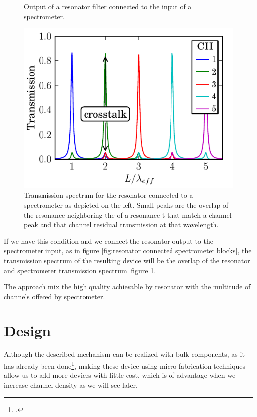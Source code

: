 \documentclass[12pt,twoside,english]{book}
\renewcommand{\~}{\perispomeni}%
\numberwithin{equation}{section}
\numberwithin{figure}{section}
\begin{document}
\begin{figure}[h]
	\begin{minipage}[t]{0.49\columnwidth}%
	
	\caption{Output of a resonator filter connected to the input of a spectrometer.}
	\label{fig:resonator connected spectrometer blocks}
	\end{minipage}\hfill
	\begin{minipage}[t]{0.49\columnwidth}%
	\includegraphics{ring-enhaced-tog}
	\caption{Transmission spectrum for the resonator connected to a spectrometer as depicted on the left. Small peaks are the overlap of the resonance neighboring the of a resonance t that match a channel peak and that channel residual transmission at that wavelength.}
	\label{fig:spectrum resonator connected spectrometer}
	\end{minipage}
\end{figure}
If we have this condition and we connect the resonator output to the spectrometer input, as in figure \ref{fig:resonator connected spectrometer blocks}, the transmission spectrum of the resulting device will be the overlap of the resonator and spectrometer transmission spectrum, figure \ref{fig:spectrum resonator connected spectrometer}.

The approach mix the high quality achievable by resonator with the multitude of channels offered by spectrometer.

\section{Design}
Although the described mechanism can be realized with bulk components, as it has already been done\footcite{bajraszewski:2008p1743}, making these device using micro-fabrication techniques allow us to add more devices with little cost, which is of advantage when we increase channel density as we will see later.
\end{document}
